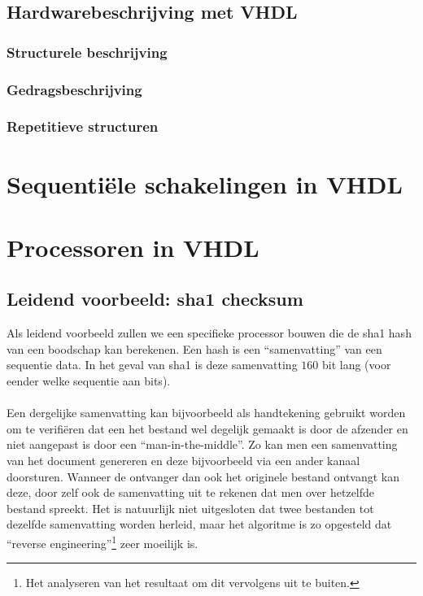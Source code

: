 \subsection{Hardwarebeschrijving met VHDL}

\subsubsection{Structurele beschrijving}

\subsubsection{Gedragsbeschrijving}

\subsubsection{Repetitieve structuren}

\section{Sequenti\"ele schakelingen in VHDL}

\section{Processoren in VHDL}

\subsection{Leidend voorbeeld: sha1 checksum}
Als leidend voorbeeld zullen we een specifieke processor bouwen die de sha1 hash van een boodschap kan berekenen. Een hash is een ``samenvatting'' van een sequentie data. In het geval van sha1 is deze samenvatting $160$ bit lang (voor eender welke sequentie aan bits).

\paragraph{}
Een dergelijke samenvatting kan bijvoorbeeld als handtekening gebruikt worden om te verifi\"eren dat een het bestand wel degelijk gemaakt is door de afzender en niet aangepast is door een ``man-in-the-middle''. Zo kan men een samenvatting van het document genereren en deze bijvoorbeeld via een ander kanaal doorsturen. Wanneer de ontvanger dan ook het originele bestand ontvangt kan deze, door zelf ook de samenvatting uit te rekenen dat men over hetzelfde bestand spreekt. Het is natuurlijk niet uitgesloten dat twee bestanden tot dezelfde samenvatting worden herleid, maar het algoritme is zo opgesteld dat ``reverse engineering''\footnote{Het analyseren van het resultaat om dit vervolgens uit te buiten.} zeer moeilijk is.

